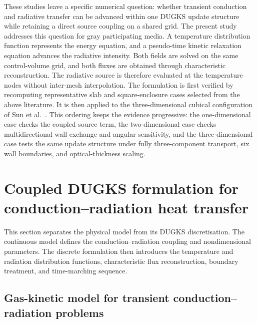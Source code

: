 \documentclass[a4paper,12pt]{ctexart}
\numberwithin{equation}{section}
\begin{document}
These studies leave a specific numerical question: whether transient conduction and radiative transfer can be advanced within one DUGKS update structure while retaining a direct source coupling on a shared grid. The present study addresses this question for gray participating media. A temperature distribution function represents the energy equation, and a pseudo-time kinetic relaxation equation advances the radiative intensity. Both fields are solved on the same control-volume grid, and both fluxes are obtained through characteristic reconstruction. The radiative source is therefore evaluated at the temperature nodes without inter-mesh interpolation. The formulation is first verified by recomputing representative slab and square-enclosure cases selected from the above literature. It is then applied to the three-dimensional cubical configuration of Sun et al.~\cite{SunMaLi2012}. This ordering keeps the evidence progressive: the one-dimensional case checks the coupled source term, the two-dimensional case checks multidirectional wall exchange and angular sensitivity, and the three-dimensional case tests the same update structure under fully three-component transport, six wall boundaries, and optical-thickness scaling.

\section{Coupled DUGKS formulation for conduction--radiation heat transfer}
\label{sec:coupled_dugks}

This section separates the physical model from its DUGKS discretisation. The continuous model defines the conduction--radiation coupling and nondimensional parameters. The discrete formulation then introduces the temperature and radiation distribution functions, characteristic flux reconstruction, boundary treatment, and time-marching sequence.

\subsection{Gas-kinetic model for transient conduction--radiation problems}
\label{subsec:kinetic_model}
\end{document}
